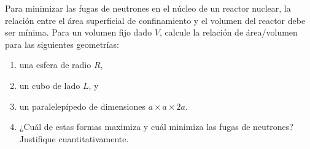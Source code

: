 \item Para minimizar las fugas de neutrones en el núcleo de un reactor nuclear, la relación entre el área superficial de confinamiento y el volumen del reactor debe ser mínima. Para un volumen fijo dado $V$, calcule la relación de área/volumen para las siguientes geometrías:
\begin{enumerate}
    \item una esfera de radio $R$,
    \item un cubo de lado $L$, y
    \item un paralelepípedo de dimensiones $a \times a \times 2a$.
    \item ¿Cuál de estas formas maximiza y cuál minimiza las fugas de neutrones? Justifique cuantitativamente.
\end{enumerate}